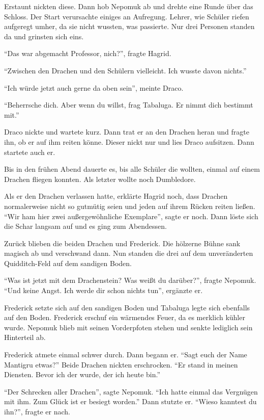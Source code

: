Erstaunt nickten diese. Dann hob Nepomuk ab und drehte eine Runde über das Schloss. Der Start verursachte einiges an Aufregung. Lehrer, wie Schüler riefen aufgeregt umher, da sie nicht wussten, was passierte. Nur drei Personen standen da und grinsten sich eins.

\enquote{Das war abgemacht Professor, nich?}, fragte Hagrid.

\enquote{Zwischen den Drachen und den Schülern vielleicht. Ich wusste davon nichts.}

\enquote{Ich würde jetzt auch gerne da oben sein}, meinte Draco.

\enquote{Beherrsche dich. Aber wenn du willst, frag Tabaluga. Er nimmt dich bestimmt mit.}

Draco nickte und wartete kurz. Dann trat er an den Drachen heran und fragte ihn, ob er auf ihm reiten könne. Dieser nickt nur und lies Draco aufsitzen. Dann startete auch er.

Bis in den frühen Abend dauerte es, bis alle Schüler die wollten, einmal auf einem Drachen fliegen konnten. Als letzter wollte noch Dumbledore.

Als er den Drachen verlassen hatte, erklärte Hagrid noch, dass Drachen normalerweise nicht so gutmütig seien und jeden auf ihrem Rücken reiten ließen. \enquote{Wir ham hier zwei außergewöhnliche Exemplare}, sagte er noch. Dann löste sich die Schar langsam auf und es ging zum Abendessen.

Zurück blieben die beiden Drachen und Frederick. Die hölzerne Bühne sank magisch ab und verschwand dann. Nun standen die drei auf dem unveränderten Quidditch-Feld auf dem sandigen Boden.

\enquote{Was ist jetzt mit dem Drachenstein? Was weißt du darüber?}, fragte Nepomuk. \enquote{Und keine Angst. Ich werde dir schon nichts tun}, ergänzte er.

Frederick setzte sich auf den sandigen Boden und Tabaluga legte sich ebenfalls auf den Boden. Frederick erschuf ein wärmendes Feuer, da es merklich kühler wurde. Nepomuk blieb mit seinen Vorderpfoten stehen und senkte lediglich sein Hinterteil ab.

Frederick atmete einmal schwer durch. Dann begann er. \enquote{Sagt euch der Name Mantigru etwas?} Beide Drachen nickten erschrocken. \enquote{Er stand in meinen Diensten. Bevor ich der wurde, der ich heute bin.}

\enquote{Der Schrecken aller Drachen}, sagte Nepomuk. \enquote{Ich hatte einmal das Vergnügen mit ihm. Zum Glück ist er besiegt worden.} Dann stutzte er. \enquote{Wieso kanntest du ihn?}, fragte er nach.


